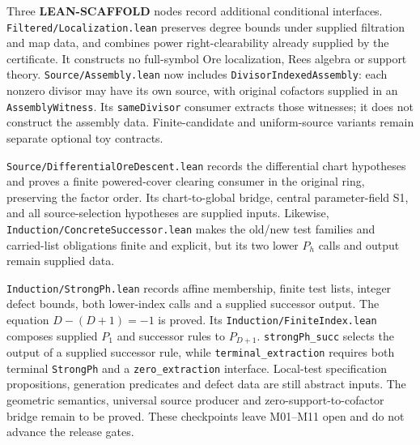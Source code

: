\documentclass[10pt,a4paper]{article}
\newcommand{\lean}[1]{\nolinkurl{#1}}
\begin{document}
Three \textbf{LEAN-SCAFFOLD} nodes record additional conditional interfaces.
\lean{Filtered/Localization.lean} preserves degree bounds under supplied
filtration and map data, and combines power right-clearability already
supplied by the certificate. It constructs no full-symbol Ore localization,
Rees algebra or support theory. \lean{Source/Assembly.lean} now includes
\lean{DivisorIndexedAssembly}: each nonzero divisor may have its own source,
with original cofactors supplied in an \lean{AssemblyWitness}. Its
\lean{sameDivisor} consumer extracts those witnesses; it does not construct
the assembly data. Finite-candidate and uniform-source variants remain
separate optional toy contracts.

\lean{Source/DifferentialOreDescent.lean} records the differential chart
hypotheses and proves a finite powered-cover clearing consumer in the original
ring, preserving the factor order.  Its chart-to-global bridge, central
parameter-field S1, and all source-selection hypotheses are supplied inputs.
Likewise, \lean{Induction/ConcreteSuccessor.lean} makes the old/new test
families and carried-list obligations finite and explicit, but its two lower
\(P_h\) calls and output remain supplied data.

\lean{Induction/StrongPh.lean} records affine membership, finite test lists,
integer defect bounds, both lower-index calls and a supplied successor
output. The equation \(D-(D+1)=-1\) is proved. Its
\lean{Induction/FiniteIndex.lean} composes supplied \(P_1\) and successor rules
to \(P_{D+1}\). \lean{strongPh_succ} selects the output of a supplied successor rule, while
\lean{terminal_extraction} requires both terminal \lean{StrongPh} and a
\lean{zero_extraction} interface. Local-test specification propositions,
generation predicates and defect data are still abstract inputs. The
geometric semantics, universal source producer and zero-support-to-cofactor
bridge remain to be proved. These checkpoints leave M01--M11 open and do not
advance the release gates.
\end{document}
